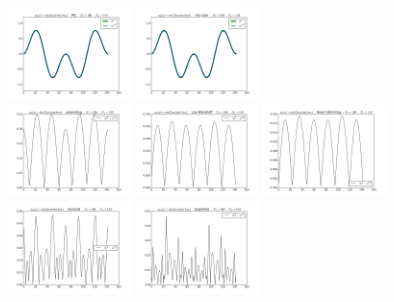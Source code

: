 \documentclass{article} %
\theoremstyle{plain}
\numberwithin{equation}{section} %
\numberwithin{figure}{section} %
\numberwithin{table}{section} %
\begin{document}
\begin{enumerate}[\ \ (a)]
\begin{figure}[ht!]
            \includegraphics[width=0.29\textwidth]{figures/power_4/problem_2_2_6_a.png}
            \includegraphics[width=0.29\textwidth]{figures/power_4/problem_2_2_7_a.png}\\
            \includegraphics[width=0.29\textwidth]{figures/power_4/problem_2_2_1_b.png}
            \includegraphics[width=0.29\textwidth]{figures/power_4/problem_2_2_2_b.png}
            \includegraphics[width=0.29\textwidth]{figures/power_4/problem_2_2_3_b.png}
            \includegraphics[width=0.29\textwidth]{figures/power_4/problem_2_2_4_b.png}
            \includegraphics[width=0.29\textwidth]{figures/power_4/problem_2_2_5_b.png}

\end{figure}
\end{enumerate}
\end{document}
